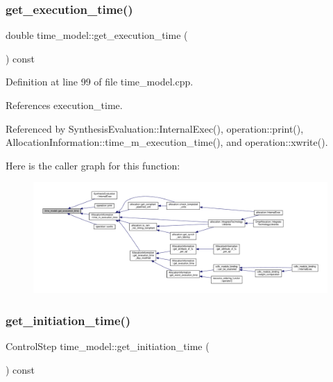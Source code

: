 \subsubsection{\texorpdfstring{get\+\_\+execution\+\_\+time()}{get\_execution\_time()}}
{\footnotesize\ttfamily double time\+\_\+model\+::get\+\_\+execution\+\_\+time (\begin{DoxyParamCaption}{ }\end{DoxyParamCaption}) const}



Definition at line 99 of file time\+\_\+model.\+cpp.



References execution\+\_\+time.



Referenced by Synthesis\+Evaluation\+::\+Internal\+Exec(), operation\+::print(), Allocation\+Information\+::time\+\_\+m\+\_\+execution\+\_\+time(), and operation\+::xwrite().

Here is the caller graph for this function\+:
\nopagebreak
\begin{figure}[H]
\begin{center}
\leavevmode
\includegraphics[width=350pt]{d3/d73/classtime__model_ab4f348d14a35c9ff8f35a6f5d65aa04c_icgraph}
\end{center}
\end{figure}
\mbox{\label{classtime__model_a25614ecc690c443f3aab565a3db610f3}} 
\subsubsection{\texorpdfstring{get\+\_\+initiation\+\_\+time()}{get\_initiation\_time()}}
{\footnotesize\ttfamily Control\+Step time\+\_\+model\+::get\+\_\+initiation\+\_\+time (\begin{DoxyParamCaption}{ }\end{DoxyParamCaption}) const}



